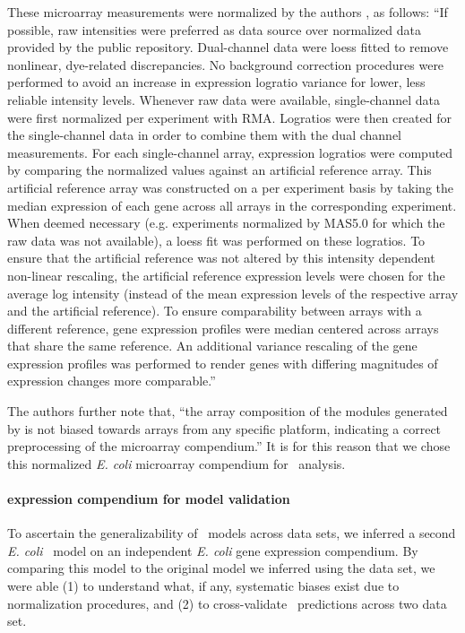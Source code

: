 These microarray measurements were normalized by the authors \cite{lemmens_distiller:_2009}, as follows: ``If possible, raw intensities were preferred as data source over normalized data provided by the public repository. Dual-channel data were loess fitted to remove nonlinear, dye-related discrepancies. No background correction procedures were performed to avoid an increase in expression logratio variance for lower, less reliable intensity levels. Whenever raw data were available, single-channel data were first normalized per experiment with RMA. Logratios were then created for the single-channel data in order to combine them with the dual channel measurements. For each single-channel array, expression logratios were computed by comparing the normalized values against an artificial reference array.  This artificial reference array was constructed on a per experiment basis by taking the median expression of each gene across all arrays in the corresponding experiment. When deemed necessary (e.g. experiments normalized by MAS5.0 for which the raw data was not available), a loess fit was performed on these logratios. To ensure that the artificial reference was not altered by this intensity dependent non-linear rescaling, the artificial reference expression levels were chosen for the average log intensity (instead of the mean expression levels of the respective array and the artificial reference). To ensure comparability between arrays with a different reference, gene expression profiles were median centered across arrays that share the same reference. An additional variance rescaling of the gene expression profiles was performed to render genes with differing magnitudes of expression changes more comparable.''

The authors further note that, ``the array composition of the modules generated by  is not biased towards arrays from any specific platform, indicating a correct preprocessing of the microarray compendium.'' \cite{lemmens_distiller:_2009} It is for this reason that we chose this normalized {\it E. coli} microarray compendium for \egrine~analysis.

\paragraph{ expression compendium for model validation}
\label{section:dream5_data_compendium}

To ascertain the generalizability of \egrine~models across data sets, we inferred a second \textit{E. coli} \egrine~model on an independent \textit{E. coli} gene expression compendium. By comparing this model to the original model we inferred using the  data set, we were able (1) to understand what, if any, systematic biases exist due to normalization procedures, and (2) to cross-validate \egrine~predictions across two data set.

